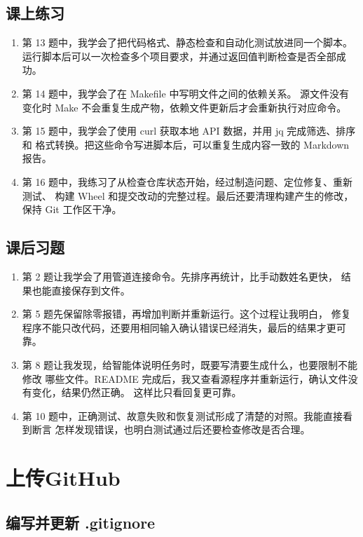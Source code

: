 \documentclass[a4paper,12pt]{report}
\begin{document}
\section{课上练习}
\begin{enumerate}
  \item {\large 第 13 题中，我学会了把代码格式、静态检查和自动化测试放进同一个脚本。
  运行脚本后可以一次检查多个项目要求，并通过返回值判断检查是否全部成功。}
  \item {\large 第 14 题中，我学会了在 Makefile 中写明文件之间的依赖关系。
  源文件没有变化时 Make 不会重复生成产物，依赖文件更新后才会重新执行对应命令。}
  \item {\large 第 15 题中，我学会了使用 curl 获取本地 API 数据，并用 jq 完成筛选、排序和
  格式转换。把这些命令写进脚本后，可以重复生成内容一致的 Markdown 报告。}
  \item {\large 第 16 题中，我练习了从检查仓库状态开始，经过制造问题、定位修复、重新测试、
  构建 Wheel 和提交改动的完整过程。最后还要清理构建产生的修改，保持 Git 工作区干净。}
\end{enumerate}

\section{课后习题}
\begin{enumerate}
  \item {\large 第 2 题让我学会了用管道连接命令。先排序再统计，比手动数姓名更快，
  结果也能直接保存到文件。}
  \item {\large 第 5 题先保留除零报错，再增加判断并重新运行。这个过程让我明白，
  修复程序不能只改代码，还要用相同输入确认错误已经消失，最后的结果才更可靠。}
  \item {\large 第 8 题让我发现，给智能体说明任务时，既要写清要生成什么，也要限制不能修改
  哪些文件。README 完成后，我又查看源程序并重新运行，确认文件没有变化，结果仍然正确。
  这样比只看回复更可靠。}
  \item {\large 第 10 题中，正确测试、故意失败和恢复测试形成了清楚的对照。我能直接看到断言
  怎样发现错误，也明白测试通过后还要检查修改是否合理。}
\end{enumerate}

\color{red}\chapter{上传GitHub}\color{black}

\section{编写并更新 .gitignore}
\end{document}
